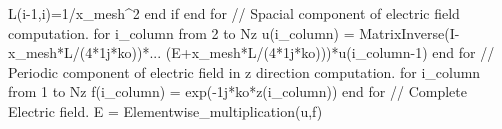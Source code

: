 \documentclass[a4paper]{article}
\begin{document}
{		\indent\indent L(i-1,i)=1/x\_mesh\string^2\newline
		\indent end if\newline
		end for\newline\newline	
		\textcolor{OliveGreen}{// Spacial component of electric field computation.}\newline
		for i\_column from 2 to Nz\newline
		\indent u(i\_column) = MatrixInverse(I-x\_mesh*L/(4*1j*ko))*...\newline
		\indent\indent\indent\indent\indent\indent\indent\indent\indent\indent\indent(E+x\_mesh*L/(4*1j*ko)))*u(i\_column-1)\newline
		end for\newline\newline
		\textcolor{OliveGreen}{// Periodic component of electric field in z direction computation.}\newline
		for i\_column from 1 to Nz\newline
		\indent f(i\_column) = exp(-1j*ko*z(i\_column))\newline
		end for\newline\newline
		\textcolor{OliveGreen}{// Complete Electric field.}\newline
		E = Elementwise\_multiplication(u,f)\newline\newline
	    }
		\newpage
		
\end{document}
